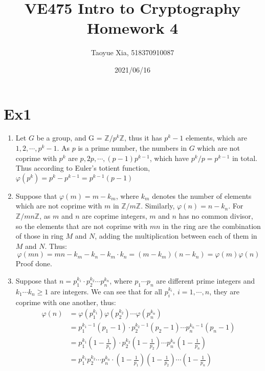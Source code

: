 \documentclass[12pt, a4paper]{article}
\begin{document}
\title{VE475 Intro to Cryptography Homework 4}
\author{Taoyue Xia, 518370910087}
\date{2021/06/16}
\maketitle

\section*{Ex1}
\begin{enumerate}
    \item Let $G$ be a group, and G = $\mathbb{Z}/p^k\mathbb{Z}$, thus it has $p^k - 1$ elements, which are $1, 2,\cdots, p^k - 1$.
          As $p$ is a prime number, the numbers in $G$ which are not coprime with $p^k$ are $p, 2p, \cdots, (p-1)p^{k-1}$, 
          which have $p^k / p = p^{k-1}$ in total.\newline
          Thus according to Euler's totient function, $\varphi(p^k) = p^k - p^{k-1} = p^{k-1}(p - 1)$
    \item Suppose that $\varphi(m) = m - k_m$, where $k_m$ denotes the number of elements which are not coprime with $m$ in $\mathbb{Z}/m\mathbb{Z}$.
          Similarly, $\varphi(n) = n - k_n$. For $\mathbb{Z}/mn\mathbb{Z}$, as $m$ and $n$ are coprime integers, 
          $m$ and $n$ has no common divisor, 
          so the elements that are not coprime with $mn$ in the ring are the combination of those in ring $M$ and $N$, 
          adding the multiplication between each of them in $M$ and $N$. Thus:
          $$\varphi(mn) = mn - k_m - k_n - k_m\cdot k_n = (m - k_m)(n - k_n) = \varphi(m)\varphi(n)$$
          Proof done.
    \item Suppose that $n = p_1^{k_1}\cdot p_2^{k_2}\cdots p_n^{k_n}$, where $p_1\cdots p_n$ are different prime integers 
          and $k_1\cdots k_n \geq 1$ are integers. We can see that for all $p_i^{k_i},\ i = 1, \cdots, n$, 
          they are coprime with one another, thus:
          \begin{align*}
              \varphi(n) &= \varphi(p_1^{k_1})\varphi(p_2^{k_2})\cdots \varphi(p_n^{k_n})\\
                         &= p_1^{k_1 - 1}(p_1 - 1)\cdot p_2^{k_2 - 1}(p_2 - 1) \cdots p_n^{k_n - 1}(p_n - 1)\\
                         &= p_1^{k_1}(1 - \frac{1}{p_1})\cdot p_2^{k_2}(1 - \frac{1}{p_2})\cdots p_n^{k_n}(1 - \frac{1}{p_n})\\
                         &= p_1^{k_1}p_2^{k_2}\cdots p_n^{k_n} \cdot (1 - \frac{1}{p_1})(1 - \frac{1}{p_2})\cdots (1 - \frac{1}{p_n})\\

\end{align*}
\end{enumerate}
\end{document}

